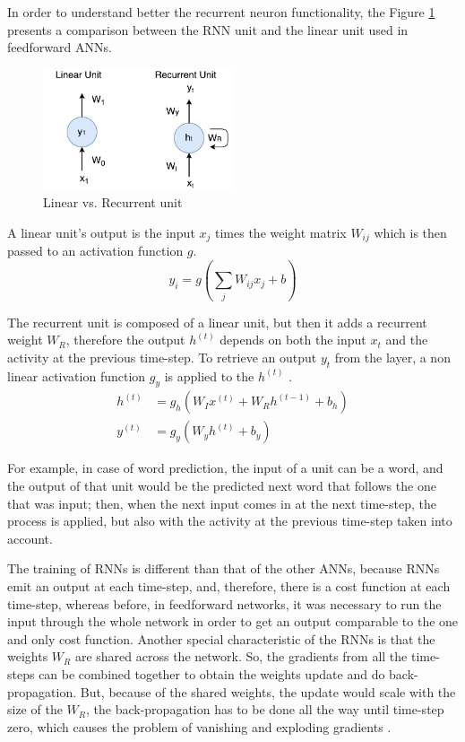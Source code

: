 In order to understand better the recurrent neuron functionality, the Figure \ref{Units} presents a comparison between the RNN unit and the linear unit used in feedforward ANNs.

\begin{figure}[H]
	\centering
	\includegraphics[width=0.5\textwidth]{Figures/RecurrentUnit}
	\caption{Linear vs. Recurrent unit}
	\label{Units}
\end{figure}
A linear unit's output is the input $x_{j}$ times the weight matrix $W_{ij}$ which is then passed to an activation function $g$.
\begin{equation}\label{linearOutput}
y_{i}=g(\sum_{j}W_{ij}x_{j}+b)
\end{equation}

The recurrent unit is composed of a linear unit, but then it adds a recurrent weight $W_{R}$, therefore the output $h^{(t)}$ depends on both the input $x_{t}$ and the activity at the previous time-step. To retrieve an output $y_{t}$ from the layer, a non linear activation function $g_{y}$ is applied to the $h^{(t)}$ \cite{NeonRNN}.
\begin{equation}\label{recurrentOutput}
\begin{aligned}
h^{(t)}&=g_{h}(W_{I}x^{(t)}+W_{R}h^{(t-1)}+b_{h})\\
y^{(t)}&=g_{y}(W_{y}h^{(t)}+b_{y})
\end{aligned}
\end{equation}

For example, in case of word prediction, the input of a unit can be a word, and the output of that unit would be the predicted next word that follows the one that was input; then, when the next input comes in at the next time-step, the process is applied, but also with the activity at the previous time-step taken into account.

The training of RNNs is different than that of the other ANNs, because RNNs emit an output at each time-step, and, therefore, there is a cost function at each time-step, whereas before, in feedforward networks, it was necessary to run the input through the whole network in order to get an output comparable to the one and only cost function. Another special characteristic of the RNNs is that the weights $W_{R}$ are shared across the network. So, the gradients from all the time-steps can be combined together to obtain the weights update and do back-propagation. But, because of the shared weights, the update would scale with the size of the $W_{R}$, the back-propagation has to be done all the way until time-step zero, which causes the problem of vanishing and exploding gradients \cite{NeonRNN}.

